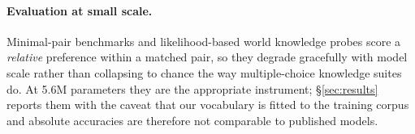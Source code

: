 \paragraph{Evaluation at small scale.}
Minimal-pair benchmarks \citep{warstadt2020blimp} and likelihood-based world
knowledge probes \citep{leong2023ewok} score a \emph{relative} preference within a
matched pair, so they degrade gracefully with model scale rather than collapsing
to chance the way multiple-choice knowledge suites do. At 5.6M parameters they are
the appropriate instrument; \S\ref{sec:results} reports them with the caveat that
our vocabulary is fitted to the training corpus and absolute accuracies are
therefore not comparable to published models.
